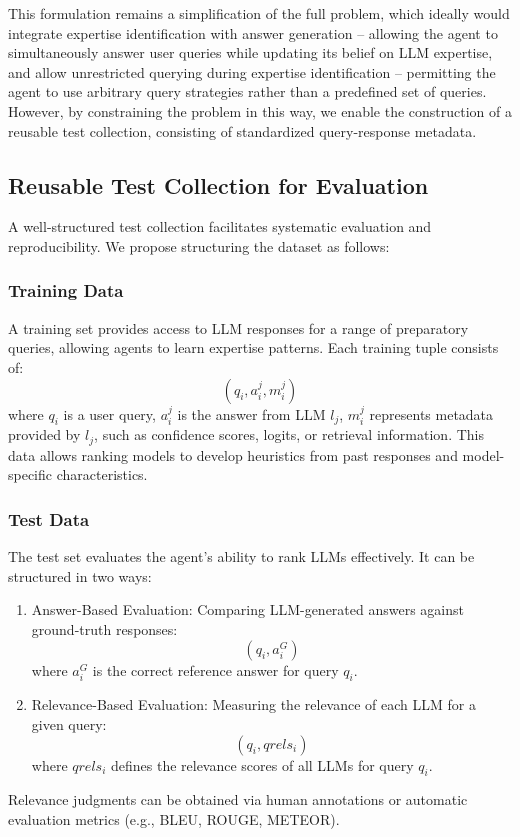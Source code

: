 This formulation remains a simplification of the full problem, which ideally would integrate expertise identification with answer generation -- allowing the agent to simultaneously answer user queries while updating its belief on LLM expertise, and allow unrestricted querying during expertise identification -- permitting the agent to use arbitrary query strategies rather than a predefined set of queries. However, by constraining the problem in this way, we enable the construction of a reusable test collection, consisting of standardized query-response metadata.

\subsection{Reusable Test Collection for Evaluation}
\label{sec:test_collection}
A well-structured test collection facilitates systematic evaluation and reproducibility. We propose structuring the dataset as follows:

\subsubsection{Training Data}  

A training set provides access to LLM responses for a range of preparatory queries, allowing agents to learn expertise patterns. Each training tuple consists of:
\[
(q_i, a_i^j, m_i^j)
\]
where $q_i$ is a user query, $a_i^j$ is the answer from LLM $l_j$, $m_i^j$ represents metadata provided by $l_j$, such as confidence scores, logits, or retrieval information. This data allows ranking models to develop heuristics from past responses and model-specific characteristics.

\subsubsection{Test Data}

The test set evaluates the agent's ability to rank LLMs effectively. It can be structured in two ways:

\begin{enumerate}
    \item Answer-Based Evaluation: Comparing LLM-generated answers against ground-truth responses:
    \[
    (q_i, a_i^G)
    \]
    where $a_i^G$ is the correct reference answer for query $q_i$.

    \item Relevance-Based Evaluation: Measuring the relevance of each LLM for a given query:
    \[
    (q_i, qrels_i)
    \]
    where $qrels_i$ defines the relevance scores of all LLMs for query $q_i$.
\end{enumerate}
Relevance judgments can be obtained via human annotations or automatic evaluation metrics (e.g., BLEU, ROUGE, METEOR).

